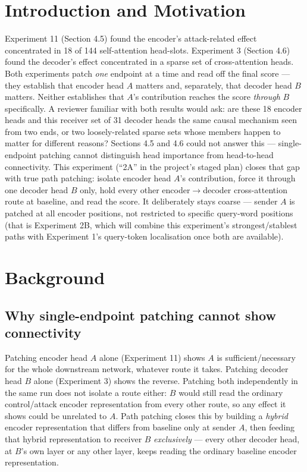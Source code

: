 \documentclass[11pt]{article}
\begin{document}
\tableofcontents
\newpage

\section{Introduction and Motivation}

Experiment 11 (Section 4.5) found the encoder's attack-related effect
concentrated in 18 of 144 self-attention head-slots. Experiment 3 (Section
4.6) found the decoder's effect concentrated in a sparse set of cross-attention
heads. Both experiments patch \emph{one} endpoint at a time and read off the
final score — they establish that encoder head $A$ matters and, separately,
that decoder head $B$ matters. Neither establishes that $A$'s contribution
reaches the score \emph{through} $B$ specifically. A reviewer familiar with
both results would ask: are these 18 encoder heads and this receiver set of
31 decoder heads the same causal mechanism seen from two ends, or two
loosely-related sparse sets whose members happen to matter for different
reasons? Sections 4.5 and 4.6 could not answer this — single-endpoint
patching cannot distinguish head importance from head-to-head connectivity.
This experiment (``2A'' in the project's staged plan) closes that gap with
true path patching: isolate encoder head $A$'s contribution, force it through
one decoder head $B$ only, hold every other encoder$\to$decoder cross-attention
route at baseline, and read the score. It deliberately stays coarse — sender
$A$ is patched at all encoder positions, not restricted to specific query-word
positions (that is Experiment 2B, which will combine this experiment's
strongest/stablest paths with Experiment 1's query-token localisation once
both are available).

\section{Background}

\subsection{Why single-endpoint patching cannot show connectivity}

Patching encoder head $A$ alone (Experiment 11) shows $A$ is sufficient/necessary
for the whole downstream network, whatever route it takes. Patching decoder
head $B$ alone (Experiment 3) shows the reverse. Patching both independently
in the same run does not isolate a route either: $B$ would still read the
ordinary control/attack encoder representation from every other route, so any
effect it shows could be unrelated to $A$. Path patching closes this by
building a \emph{hybrid} encoder representation that differs from baseline
only at sender $A$, then feeding that hybrid representation to receiver $B$
\emph{exclusively} — every other decoder head, at $B$'s own layer or any
other layer, keeps reading the ordinary baseline encoder representation.
\end{document}
